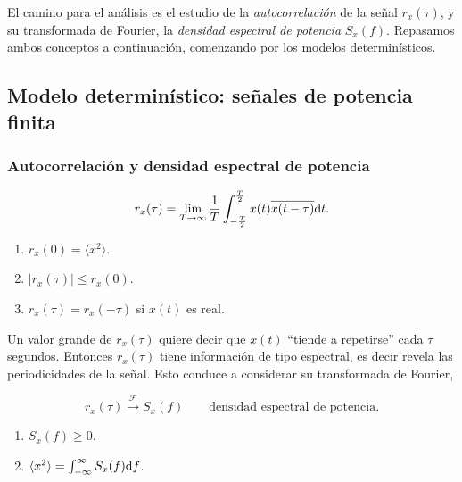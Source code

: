El camino para el análisis es el estudio de la
\emph{autocorrelación} de la señal $r_x(\tau)$, y su transformada
de Fourier, la {\em densidad espectral de potencia} $S_x(f)$.
Repasamos ambos conceptos a continuación, comenzando por los
modelos determinísticos.

%
%


\subsection*{Modelo determinístico: señales de potencia finita}

\subsubsection*{Autocorrelación y densidad espectral de potencia}

\[r_x(\tau)=\lim_{T\rightarrow\infty} \frac{1}{T}\int^{\frac{T}{2}}_{-\frac{T}{2}} x(t)\overline{x(t-\tau)}\mathrm{d} t.\]

\begin{propiedadesSN}\mbox{}
    \begin{enumerate}
        \item $r_x(0)=\langle x^2\rangle$.
        \item $|r_x(\tau)|\leq r_x(0)$.
        \item $r_x(\tau) = r_x(-\tau)$ si $x(t)$ es real.
    \end{enumerate}
\end{propiedadesSN}

Un valor grande de $r_x(\tau)$ quiere decir que $x(t)$ ``tiende a
repetirse'' cada $\tau$ segundos. Entonces $r_x(\tau)$ tiene
información de tipo espectral, es decir revela las periodicidades
de la señal. Esto conduce a considerar su transformada de Fourier,

\[r_x(\tau)\stackrel{\mathcal{F}}{\longrightarrow} S_x(f)\qquad\text{densidad espectral de potencia.}\]


\begin{propiedadesSN}\mbox{}
    \begin{enumerate}
        \item $S_x(f)\geq 0$.
        \item $\langle x^2\rangle = \int^{\infty}_{-\infty} S_x(f)\mathrm{d}
        f$.
    \end{enumerate}
\end{propiedadesSN}

